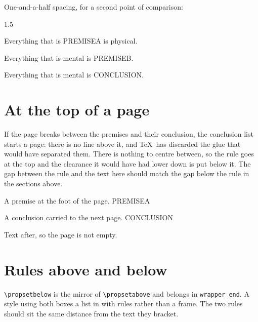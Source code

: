 \documentclass{article}
\newcommand\PA{PREMISEA}
\newcommand\PB{PREMISEB}
\newcommand\CC{CONCLUSION}
\begin{document}
One-and-a-half spacing, for a second point of comparison:

\begin{spacing}{1.5}
\begin{prop}
  \item Everything that is \PA{} is physical.
  \item Everything that is mental is \PB.
\end{prop}
\begin{prop}[style=conclusion, continue=true]
  \item Everything that is mental is \CC.
\end{prop}
\end{spacing}

\section{At the top of a page}

If the page breaks between the premises and their conclusion, the conclusion
list starts a page: there is no line above it, and \TeX\ has discarded the
glue that would have separated them.  There is nothing to centre between, so
the rule goes at the top and the clearance it would have had lower down is put
below it.  The gap between the rule and the text here should match the gap
below the rule in the sections above.

\begin{prop}
  \item A premise at the foot of the page. \PA
\end{prop}
\newpage
\begin{prop}[style=conclusion]
  \item A conclusion carried to the next page. \CC
\end{prop}

Text after, so the page is not empty.

\section{Rules above and below}

\verb|\propsetbelow| is the mirror of \verb|\propsetabove| and belongs in
\texttt{wrapper end}.  A style using both boxes a list in with rules rather
than a frame.  The two rules should sit the same distance from the text they
bracket.

\begingroup
{}
\end{document}
